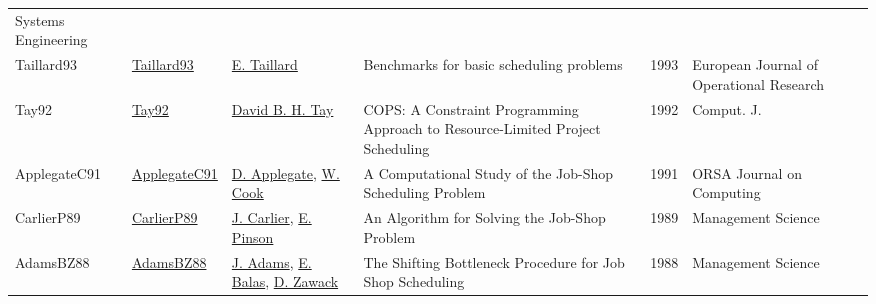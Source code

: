 {\begin{longtable}{llp{5cm}p{10cm}rp{3cm}l}
Systems Engineering & \cite{Pape94}\\Taillard93 & \href{http://dx.doi.org/10.1016/0377-2217(93)90182-m}{Taillard93} & \hyperref[auth:a872]{E. Taillard} & Benchmarks for basic scheduling problems & 1993 & European Journal of Operational Research & \cite{Taillard93}\\Tay92 & \href{}{Tay92} & \hyperref[auth:a711]{David B. H. Tay} & {COPS:} {A} Constraint Programming Approach to Resource-Limited Project Scheduling & 1992 & Comput. J. & \cite{Tay92}\\ApplegateC91 & \href{http://dx.doi.org/10.1287/ijoc.3.2.149}{ApplegateC91} & \hyperref[auth:a877]{D. Applegate}, \hyperref[auth:a878]{W. Cook} & A Computational Study of the Job-Shop Scheduling Problem & 1991 & ORSA Journal on Computing & \cite{ApplegateC91}\\CarlierP89 & \href{http://dx.doi.org/10.1287/mnsc.35.2.164}{CarlierP89} & \hyperref[auth:a859]{J. Carlier}, \hyperref[auth:a860]{E. Pinson} & An Algorithm for Solving the Job-Shop Problem & 1989 & Management Science & \cite{CarlierP89}\\AdamsBZ88 & \href{http://dx.doi.org/10.1287/mnsc.34.3.391}{AdamsBZ88} & \hyperref[auth:a882]{J. Adams}, \hyperref[auth:a883]{E. Balas}, \hyperref[auth:a884]{D. Zawack} & The Shifting Bottleneck Procedure for Job Shop Scheduling & 1988 & Management Science & \cite{AdamsBZ88}\\\end{longtable}
}

